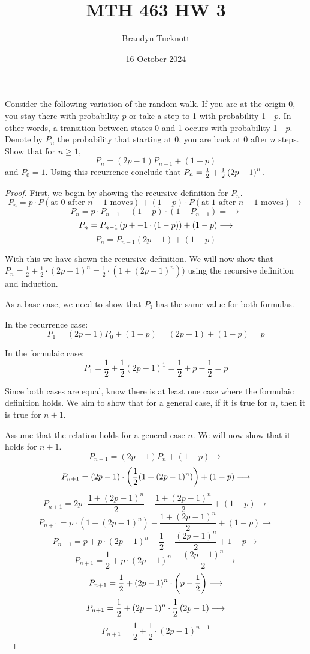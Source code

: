 \documentclass{exam}
\title{MTH 463 HW 3}
\author{Brandyn Tucknott}
\date{16 October 2024}
\begin{document}
\maketitle

\begin{questions}
    \question
Consider the following variation of the random walk. If you are at the origin 0, you stay there with probability $p$ or take a step to 1 with probability 1 - $p$. In other words, a transition between states 0 and 1 occurs with probability 1 - $p$. Denote by $P_n$ the probability that starting at 0, you are back at 0 after $n$ steps. Show that for $n \geq 1$,
$$P_n = (2p - 1)P_{n - 1} + (1 - p)$$
and $P_0 = 1$. Using this recurrence conclude that $P_n = \frac{1}{2} + \frac{1}{2}\left( 2p - 1 \right)^n$.

\begin{proof}
    First, we begin by showing the recursive definition for $P_n$.
    $$P_n = p \cdot P(\text{at 0 after $n - 1$ moves}) + (1 - p) \cdot P(\text{at 1 after $n - 1$ moves}) \longrightarrow$$
    $$P_n = p \cdot P_{n - 1} + (1 - p) \cdot (1 - P_{n - 1}) = \longrightarrow$$
    $$P_n = P_{n - 1}\left( p + -1 \cdot (1 - p) \right) + (1 - p) \longrightarrow$$
    $$P_n = P_{n - 1}(2p - 1) + (1 - p)$$

    With this we have shown the recursive definition. We will now show that $P_n = \frac{1}{2} + \frac{1}{2} \cdot (2p - 1)^n = \frac{1}{2} \cdot (1 + (2p - 1)^n))$ using the recursive definition and induction.

    As a base case, we need to show that $P_1$ has the same value for both formulas.

    In the recurrence case:
    $$P_1 = (2p - 1)P_0 + (1 - p) = (2p - 1) + (1 - p) = p$$

    In the formulaic case:
    $$P_1 = \frac{1}{2} + \frac{1}{2}(2p - 1)^1 = \frac{1}{2} + p - \frac{1}{2} = p$$

    Since both cases are equal, know there is at least one case where the formulaic definition holds. We aim to show that for a general case, if it is true for $n$, then it is true for $n + 1$.

    Assume that the relation holds for a general case $n$. We will now show that it holds for $n + 1$.
    $$P_{n + 1} = (2p - 1)P_n + (1 - p) \longrightarrow$$
    $$P_{n + 1} = (2p - 1) \cdot \left( \frac{1}{2} (1 + (2p - 1)^n) \right) + (1 - p) \longrightarrow$$
    $$P_{n + 1} = 2p \cdot \frac{1 + (2p - 1)^n}{2} - \frac{1 + (2p - 1)^n}{2} + (1 - p) \longrightarrow$$
    $$P_{n + 1} = p \cdot (1 + (2p - 1)^n) - \frac{1 + (2p - 1)^n}{2} + (1 - p) \longrightarrow$$
    $$P_{n + 1} = p + p \cdot (2p - 1)^n - \frac{1}{2} - \frac{(2p - 1)^n}{2} + 1 - p \longrightarrow$$
    $$P_{n + 1} = \frac{1}{2} + p \cdot (2p - 1)^n - \frac{(2p - 1)^n}{2}\longrightarrow$$
    $$P_{n + 1} = \frac{1}{2} + (2p - 1)^n \cdot \left( p - \frac{1}{2} \right) \longrightarrow$$
    $$P_{n + 1} = \frac{1}{2} + (2p - 1)^n \cdot \frac{1}{2} \left( 2p - 1 \right) \longrightarrow$$
    $$P_{n + 1} = \frac{1}{2} + \frac{1}{2} \cdot (2p - 1)^{n + 1}$$


\end{proof}
\end{questions}
\end{document}
